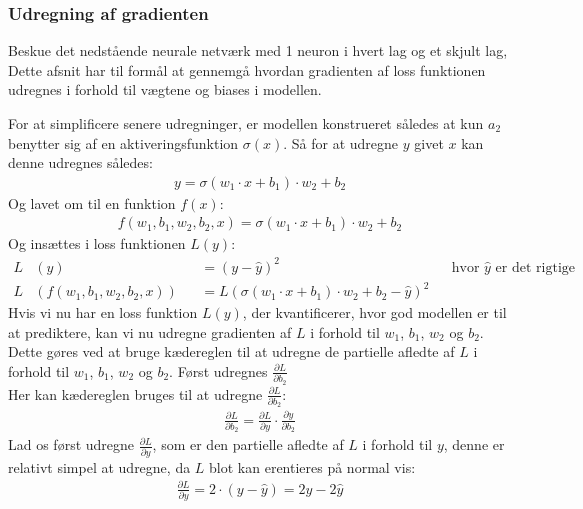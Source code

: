 \documentclass{article}
\begin{document}
\subsubsection{Udregning af gradienten}
Beskue det nedstående neurale netværk med 1 neuron i hvert lag og et skjult lag, Dette afsnit har til formål at gennemgå hvordan gradienten af loss funktionen udregnes i forhold til vægtene og biases i modellen.
\begin{center}
  
  \label{fig:neural_network3}
\end{center}
For at simplificere senere udregninger, er modellen konstrueret således at kun $a_2$ benytter sig af en aktiveringsfunktion $\sigma(x)$. Så for at udregne $y$ givet $x$ kan denne udregnes således:
\begin{align}
  y= \sigma(w_1 \cdot x + b_1) \cdot w_2 + b_2  
\end{align}
Og lavet om til en funktion $f(x)$:
\begin{align}
  f(w_1, b_1, w_2, b_2, x) = \sigma(w_1 \cdot x + b_1) \cdot w_2 + b_2
\end{align}
Og insættes i loss funktionen $L(y)$:
\begin{align}
  L&(y) &&= (y - \hat{y})^2 && \text{hvor } \hat{y} \text{ er det rigtige svar}\\
  L&(f(w_1, b_1, w_2, b_2, x)) &&= L(\sigma(w_1 \cdot x + b_1) \cdot w_2 + b_2 - \hat{y})^2
  \label{eq:full_loss}
\end{align}
Hvis vi nu har en loss funktion $L(y)$, der kvantificerer, hvor god modellen er til at prediktere, kan vi nu udregne gradienten af $L$ i forhold til $w_1$, $b_1$, $w_2$ og $b_2$. Dette gøres ved at bruge kædereglen til at udregne de partielle afledte af $L$ i forhold til $w_1$, $b_1$, $w_2$ og $b_2$. Først udregnes $\frac{\partial L}{\partial b_2}$\\
Her kan kædereglen bruges til at udregne $\frac{\partial L}{\partial b_2}$:
\begin{align}
  \frac{\partial L}{\partial b_2} = \frac{\partial L}{\partial y} \cdot \frac{\partial y}{\partial b_2}
\end{align}
Lad os først udregne $\frac{\partial L}{\partial y}$, som er den partielle afledte af $L$ i forhold til $y$, denne er relativt simpel at udregne, da $L$ blot kan erentieres på normal vis:
\begin{align}
  \frac{\partial L}{\partial y} = 2 \cdot (y - \hat{y}) = 2y - 2\hat{y}
\end{align}
\end{document}
